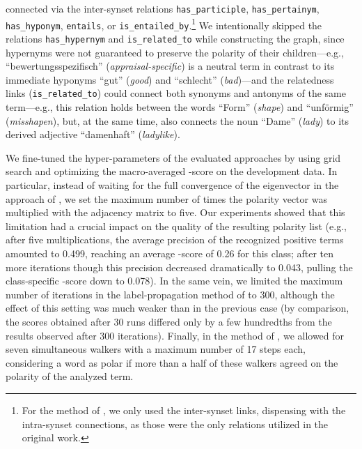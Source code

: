 connected via the inter-synset relations \texttt{has\_participle},
\texttt{has\_pertainym}, \texttt{has\_hyponym}, \texttt{entails}, or
\texttt{is\_entailed\_by}.\footnote{For the method of
  \citet{Esuli:06c}, we only used the inter-synset links, dispensing
  with the intra-synset connections, as those were the only relations
  utilized in the original work.} We intentionally skipped the
relations \texttt{has\_hypernym} and \texttt{is\_related\_to} while
constructing the graph, since hypernyms were not guaranteed to
preserve the polarity of their children---e.g.,
``bewertungsspezifisch'' (\emph{appraisal-specific}) is a neutral term
in contrast to its immediate hyponyms ``gut'' (\emph{good}) and
``schlecht'' (\emph{bad})---and the relatedness links
(\texttt{is\_related\_to}) could connect both synonyms and antonyms of
the same term---e.g., this relation holds between the words ``Form''
(\emph{shape}) and ``unf\"ormig'' (\emph{misshapen}), but, at the same
time, also connects the noun ``Dame'' (\emph{lady}) to its derived
adjective ``damenhaft'' (\emph{ladylike}).

We fine-tuned the hyper-parameters of the evaluated approaches by
using grid search and optimizing the macro-averaged \F{}-score on the
development data.  In particular, instead of waiting for the full
convergence of the eigenvector in the approach of
\citet{Blair-Goldensohn:08}, we set the maximum number of times the
polarity vector was multiplied with the adjacency matrix to five.  Our
experiments showed that this limitation had a crucial impact on the
quality of the resulting polarity list (e.g., after five
multiplications, the average precision of the recognized positive
terms amounted to 0.499, reaching an average \F{}-score of 0.26 for
this class; after ten more iterations though this precision decreased
dramatically to 0.043, pulling the class-specific \F{}-score down to
0.078).  In the same vein, we limited the maximum number of iterations
in the label-propagation method of \citet{Rao:09} to 300, although the
effect of this setting was much weaker than in the previous case (by
comparison, the scores obtained after 30 runs differed only by a few
hundredths from the results observed after 300 iterations).  Finally,
in the method of \citet{Awadallah:10}, we allowed for seven
simultaneous walkers with a maximum number of 17 steps each,
considering a word as polar if more than a half of these walkers
agreed on the polarity of the analyzed term.

